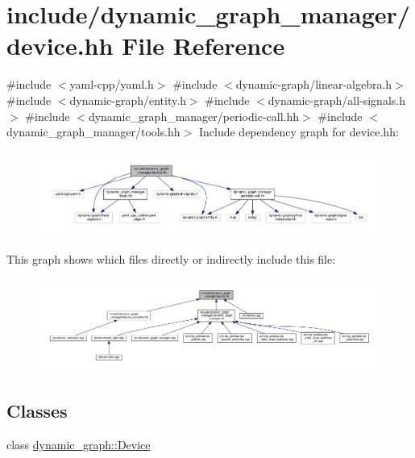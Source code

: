 \hypertarget{device_8hh}{}\section{include/dynamic\+\_\+graph\+\_\+manager/device.hh File Reference}
\label{device_8hh}
{\ttfamily \#include $<$yaml-\/cpp/yaml.\+h$>$}\newline
{\ttfamily \#include $<$dynamic-\/graph/linear-\/algebra.\+h$>$}\newline
{\ttfamily \#include $<$dynamic-\/graph/entity.\+h$>$}\newline
{\ttfamily \#include $<$dynamic-\/graph/all-\/signals.\+h$>$}\newline
{\ttfamily \#include $<$dynamic\+\_\+graph\+\_\+manager/periodic-\/call.\+hh$>$}\newline
{\ttfamily \#include $<$dynamic\+\_\+graph\+\_\+manager/tools.\+hh$>$}\newline
Include dependency graph for device.\+hh\+:
\nopagebreak
\begin{figure}[H]
\begin{center}
\leavevmode
\includegraphics[width=350pt]{device_8hh__incl}
\end{center}
\end{figure}
This graph shows which files directly or indirectly include this file\+:
\nopagebreak
\begin{figure}[H]
\begin{center}
\leavevmode
\includegraphics[width=350pt]{device_8hh__dep__incl}
\end{center}
\end{figure}
\subsection*{Classes}
\begin{DoxyCompactItemize}
\item 
class \hyperlink{classdynamic__graph_1_1Device}{dynamic\+\_\+graph\+::\+Device}
\end{DoxyCompactItemize}
